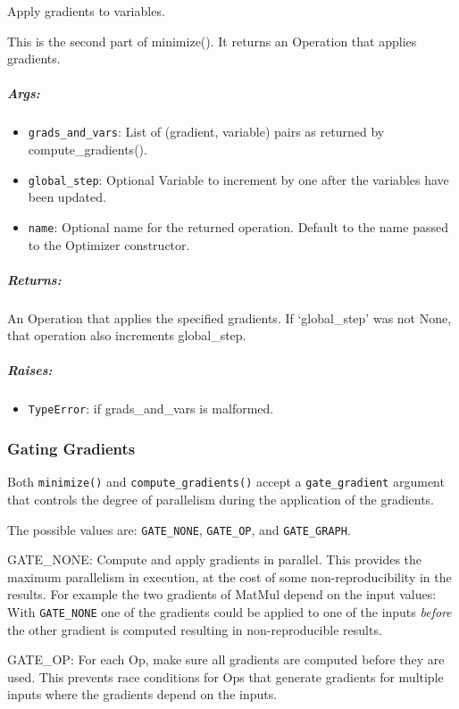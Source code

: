Apply gradients to variables.

This is the second part of minimize(). It returns an Operation that
applies gradients.

\subparagraph{Args: }\label{args-3}

\begin{itemize}
\tightlist
\item
  \texttt{grads\_and\_vars}: List of (gradient, variable) pairs as
  returned by compute\_gradients().
\item
  \texttt{global\_step}: Optional Variable to increment by one after the
  variables have been updated.
\item
  \texttt{name}: Optional name for the returned operation. Default to
  the name passed to the Optimizer constructor.
\end{itemize}

\subparagraph{Returns: }\label{returns-2}

An Operation that applies the specified gradients. If `global\_step' was
not None, that operation also increments global\_step.

\subparagraph{Raises: }\label{raises-3}

\begin{itemize}
\tightlist
\item
  \texttt{TypeError}: if grads\_and\_vars is malformed.
\end{itemize}

\subsubsection{Gating Gradients }\label{gating-gradients}

Both \texttt{minimize()} and \texttt{compute\_gradients()} accept a
\texttt{gate\_gradient} argument that controls the degree of parallelism
during the application of the gradients.

The possible values are: \texttt{GATE\_NONE}, \texttt{GATE\_OP}, and
\texttt{GATE\_GRAPH}.

GATE\_NONE: Compute and apply gradients in parallel. This provides the
maximum parallelism in execution, at the cost of some
non-reproducibility in the results. For example the two gradients of
MatMul depend on the input values: With \texttt{GATE\_NONE} one of the
gradients could be applied to one of the inputs \emph{before} the other
gradient is computed resulting in non-reproducible results.

GATE\_OP: For each Op, make sure all gradients are computed before they
are used. This prevents race conditions for Ops that generate gradients
for multiple inputs where the gradients depend on the inputs.

